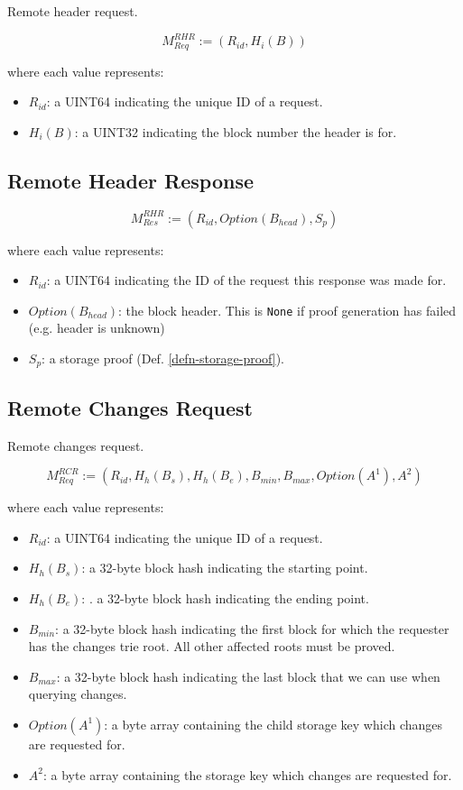 \documentclass{book}
\begin{document}
Remote header request.

\[
    M^{RHR}_{Req} := (R_{id}, H_i(B))
\]

where each value represents:

\begin{itemize}
    \item $R_{id}$: a UINT64 indicating the unique ID of a request.
    \item $H_i(B)$: a UINT32 indicating the block number the header is for.
\end{itemize}

\subsection{Remote Header Response}

\[
    M^{RHR}_{Res} := (R_{id}, Option(B_{head}), S_p)
\]

where each value represents:

\begin{itemize}
    \item $R_{id}$: a UINT64 indicating the ID of the request this response was
    made for.
    \item $Option(B_{head})$: the block header. This is \verb|None| if proof generation
    has failed (e.g. header is unknown)
    \item $S_p$: a storage proof (Def. \ref{defn-storage-proof}).
\end{itemize}

\subsection{Remote Changes Request}\label{sect-remote-changes-request}

Remote changes request.

\[
    M^{RCR}_{Req} := (R_{id}, H_h(B_s), H_h(B_e), B_{min}, B_{max}, Option(A^1), A^2)
\]

where each value represents:

\begin{itemize}
    \item $R_{id}$: a UINT64 indicating the unique ID of a request.
    \item $H_h(B_s)$: a 32-byte block hash indicating the starting point.
    \item $H_h(B_e)$: . a 32-byte block hash indicating the ending point.
    \item $B_{min}$: a 32-byte block hash indicating the first block for which
    the requester has the changes trie root. All other affected roots must be
    proved.
    \item $B_{max}$: a 32-byte block hash indicating the last block that we can
    use when querying changes.
    \item $Option(A^1)$: a byte array containing the child storage key which
    changes are requested for.
    \item $A^2$: a byte array containing the storage key which changes are
    requested for.
\end{itemize}
\end{document}
